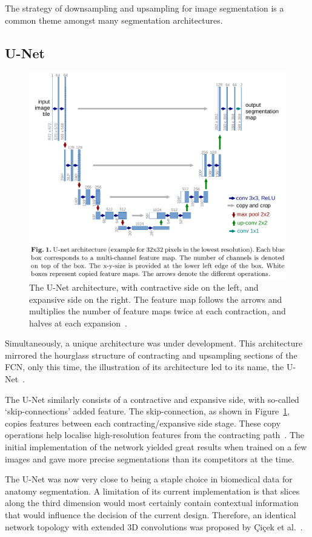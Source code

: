 \documentclass[11pt,twoside]{report}
\begin{document}
The strategy of downsampling and upsampling for image segmentation is a common theme amongst many segmentation architectures.

\subsection{U-Net}

\begin{figure}[H]
  \centering
  \includegraphics[width=.8\linewidth, trim=0 200px 0 0, clip]{../figures/u-net.png}
  \caption{The U-Net architecture, with contractive side on the left, and expansive side on the right. The feature map follows the arrows and multiplies the number of feature maps twice at each contraction, and halves at each expansion~\cite{U-Net}.}\label{fig:unet}
\end{figure}


Simultaneously, a unique architecture was under development. This architecture mirrored the hourglass structure of contracting and upsampling sections of the FCN, only this time, the illustration of its architecture led to its name, the U-Net~\cite{U-Net}.

The U-Net similarly consists of a contractive and expansive side, with so-called `skip-connections' added feature. The skip-connection, as shown in Figure~\ref{fig:unet}, copies features between each contracting/expansive side stage. These copy operations help localise high-resolution features from the contracting path~\cite{U-Net}. The initial implementation of the network yielded great results when trained on a few images and gave more precise segmentations than its competitors at the time.

The U-Net was now very close to being a staple choice in biomedical data for anatomy segmentation. A limitation of its current implementation is that slices along the third dimension would most certainly contain contextual information that would influence the decision of the current design. Therefore, an identical network topology with extended 3D convolutions was proposed by \c{C}i{\c{c}}ek et al.~\cite{DBLP:journals/corr/CicekALBR16}.
\end{document}
